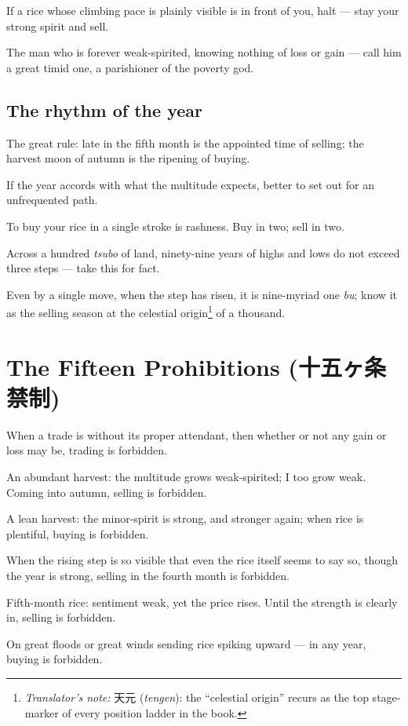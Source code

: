 \documentclass[10pt, openany]{book}
\newcommand{\jp}[1]{{\japanesefont #1}}
\newcommand{\tn}[1]{\footnote{\textit{Translator's note:} #1}}
\begin{document}
If a rice whose climbing pace is plainly visible is in front of
you, halt --- stay your strong spirit and sell.

The man who is forever weak-spirited, knowing nothing of loss or
gain --- call him a great timid one, a parishioner of the poverty
god.

\subsection*{The rhythm of the year}

The great rule: late in the fifth month is the appointed time of
selling; the harvest moon of autumn is the ripening of buying.

If the year accords with what the multitude expects, better to set
out for an unfrequented path.

To buy your rice in a single stroke is rashness. Buy in two; sell
in two.

Across a hundred \textit{tsubo} of land, ninety-nine years of
highs and lows do not exceed three steps --- take this for fact.

Even by a single move, when the step has risen, it is nine-myriad
one \textit{bu}; know it as the selling season at the celestial
origin\tn{\jp{天元} (\textit{tengen}): the ``celestial origin''
recurs as the top stage-marker of every position ladder in the
book.} of a thousand.

\section{The Fifteen Prohibitions (\jp{十五ヶ条禁制})}

When a trade is without its proper attendant, then whether or not
any gain or loss may be, trading is forbidden.

An abundant harvest: the multitude grows weak-spirited; I too grow
weak. Coming into autumn, selling is forbidden.

A lean harvest: the minor-spirit is strong, and stronger again;
when rice is plentiful, buying is forbidden.

When the rising step is so visible that even the rice itself seems
to say so, though the year is strong, selling in the fourth month
is forbidden.

Fifth-month rice: sentiment weak, yet the price rises. Until the
strength is clearly in, selling is forbidden.

On great floods or great winds sending rice spiking upward --- in
any year, buying is forbidden.
\end{document}
